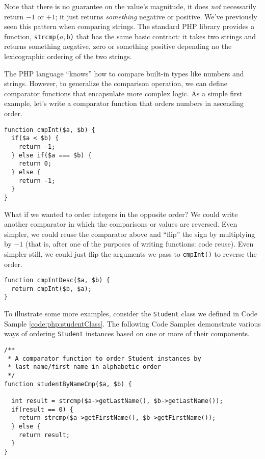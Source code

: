 Note that there is no guarantee on the value's magnitude, it does \emph{not}
necessarily return $-1$ or $+1$; it just returns \emph{something} negative or
positive.  We've previously seen this pattern when comparing strings.  The
standard PHP library provides a function, \texttt{strcmp($a, $b)} that
has the same basic contract: it takes two strings and returns something
negative, zero or something positive depending no the lexicographic ordering
of the two strings.  

The PHP language ``knows'' how to compare built-in types like numbers
and strings.  However, to generalize the comparison operation, 
we can define comparator functions that encapsulate more complex logic.
As a simple first example, let's write a comparator function that orders 
numbers in ascending order.  

\begin{verbatim}
function cmpInt($a, $b) {
  if($a < $b) {
    return -1;
  } else if($a === $b) {
    return 0;
  } else {
    return -1;
  }
}
\end{verbatim}

What if we wanted to order integers in the opposite order?  We could write
another comparator in which the comparisons or values are reversed.  Even
simpler, we could reuse the comparator above and ``flip'' the sign by 
multiplying by $-1$ (that is, after one of the purposes of writing functions:
code reuse).  Even simpler still, we could just flip the arguments we pass to 
\texttt{cmpInt()} to reverse the order.

\begin{verbatim}
function cmpIntDesc($a, $b) {
  return cmpInt($b, $a);
}
\end{verbatim}

To illustrate some more examples, consider the \texttt{Student} class
we defined in Code Sample \ref{code:php:studentClass}.  The following Code
Samples demonstrate various ways of ordering \texttt{Student} 
instances based on one or more of their components.

\begin{verbatim}
/**
 * A comparator function to order Student instances by 
 * last name/first name in alphabetic order
 */
function studentByNameCmp($a, $b) {

  int result = strcmp($a->getLastName(), $b->getLastName());
  if(result == 0) {
    return strcmp($a->getFirstName(), $b->getFirstName());
  } else {
    return result;
  }
}
\end{verbatim}

